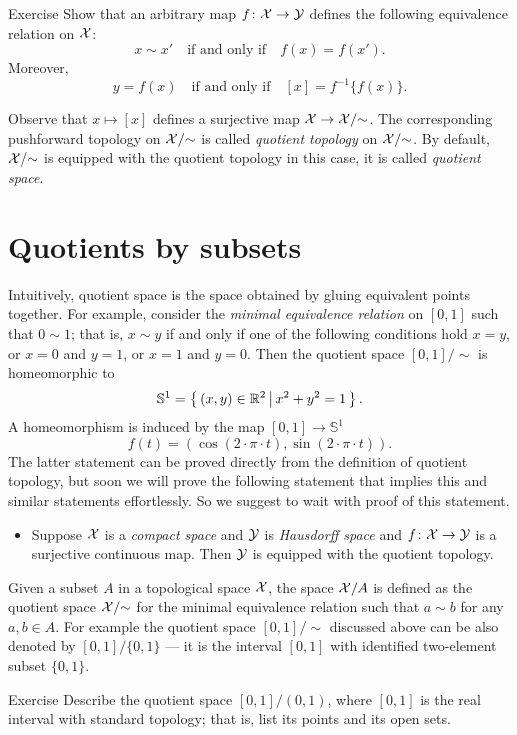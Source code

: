 \begin{thm}{Exercise}
Show that an arbitrary map $f\colon\mathcal{X}\to \mathcal{Y}$ defines the following equivalence relation on $\mathcal{X}$:
\[x\sim x'\quad\text{if and only if}\quad f(x)=f(x').\]
Moreover,
\[y=f(x)\quad\text{if and only if}\quad [x]=f^{-1}\{f(x)\}.\]
\end{thm}

Observe that $x\mapsto [x]$ defines a surjective map $\mathcal{X}\to \mathcal{X}/{\sim}$.
The corresponding pushforward topology on $\mathcal{X}/{\sim}$ is called \emph{quotient topology} on $\mathcal{X}/{\sim}$.
By default, $\mathcal{X}/{\sim}$ is equipped with the quotient topology
in this case, it is called \emph{quotient space}.

\section{Quotients by subsets}

Intuitively, quotient space is the space obtained by gluing equivalent points together.
For example, consider the \emph{minimal equivalence relation} on $[0,1]$ such that $0\sim 1$;
that is, $x\sim y$ if and only if one of the following conditions hold $x=y$, or $x=0$ and $y=1$, or $x=1$ and $y=0$.
Then the quotient space $[0,1]/{\sim}$ is homeomorphic to 
\[\mathbb{S}^1=\left\{\,{(x,y)\in\mathbb{R}^2}\,\middle|\,{x^2+y^2=1}\,\right\}.\]
A homeomorphism is induced by the map $[0,1]\to \mathbb{S}^1$
\[f(t)=\left(\cos(2\cdot\pi\cdot t),\sin(2\cdot\pi\cdot t)\right).\]
The latter statement can be proved directly from the definition of quotient topology, but soon we will prove the following statement that implies this and similar statements effortlessly.
So we suggest to wait with proof of this statement.

\begin{itemize}
\item Suppose $\mathcal{X}$ is a \emph{compact space} and  $\mathcal{Y}$ is \emph{Hausdorff space} and $f\colon \mathcal{X}\to\mathcal{Y}$ is a surjective continuous map.
Then $\mathcal{Y}$ is equipped with the quotient topology.
\end{itemize}

Given a subset $A$ in a topological space $\mathcal{X}$, the space $\mathcal{X}/A$ is defined as the quotient space $\mathcal{X}/{\sim}$ for the minimal equivalence relation such that $a\sim b$ for any $a,b\in A$.
For example the quotient space $[0,1]/{\sim}$ discussed above can be also denoted by $[0,1]/\{0,1\}$ --- it is the interval $[0,1]$ with identified two-element subset $\{0,1\}$.

\begin{thm}{Exercise}
Describe the quotient space $[0,1]/(0,1)$, where $[0,1]$ is the real interval with standard topology;
that is, list its points and its open sets.
\end{thm}



